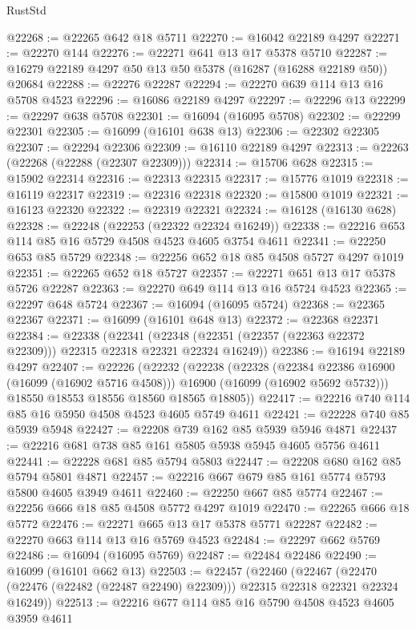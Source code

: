 \begin{lexlean}{RustStd}
\begin{coremodule}
@22268 := @22265 @642 @18 @5711
@22270 := @16042 @22189 @4297
@22271 := @22270 @144
@22276 := @22271 @641 @13 @17 @5378 @5710
@22287 := @16279 @22189 @4297 @50 @13 @50 @5378 (@16287 (@16288 @22189 @50)) @20684
@22288 := @22276 @22287
@22294 := @22270 @639 @114 @13 @16 @5708 @4523
@22296 := @16086 @22189 @4297
@22297 := @22296 @13
@22299 := @22297 @638 @5708
@22301 := @16094 (@16095 @5708)
@22302 := @22299 @22301
@22305 := @16099 (@16101 @638 @13)
@22306 := @22302 @22305
@22307 := @22294 @22306
@22309 := @16110 @22189 @4297
@22313 := @22263 (@22268 (@22288 (@22307 @22309)))
@22314 := @15706 @628
@22315 := @15902 @22314
@22316 := @22313 @22315
@22317 := @15776 @1019
@22318 := @16119 @22317
@22319 := @22316 @22318
@22320 := @15800 @1019
@22321 := @16123 @22320
@22322 := @22319 @22321
@22324 := @16128 (@16130 @628)
@22328 := @22248 (@22253 (@22322 @22324 @16249))
@22338 := @22216 @653 @114 @85 @16 @5729 @4508 @4523 @4605 @3754 @4611
@22341 := @22250 @653 @85 @5729
@22348 := @22256 @652 @18 @85 @4508 @5727 @4297 @1019
@22351 := @22265 @652 @18 @5727
@22357 := @22271 @651 @13 @17 @5378 @5726 @22287
@22363 := @22270 @649 @114 @13 @16 @5724 @4523
@22365 := @22297 @648 @5724
@22367 := @16094 (@16095 @5724)
@22368 := @22365 @22367
@22371 := @16099 (@16101 @648 @13)
@22372 := @22368 @22371
@22384 := @22338
    (@22341 (@22348 (@22351 (@22357 (@22363 @22372 @22309))) @22315 @22318 @22321 @22324 @16249))
@22386 := @16194 @22189 @4297
@22407 := @22226
    (@22232
      (@22238
        (@22328
          (@22384 @22386 @16900 (@16099 (@16902 @5716 @4508)))
          @16900
          (@16099 (@16902 @5692 @5732)))
        @18550
        @18553
        @18556
        @18560
        @18565
        @18805))
@22417 := @22216 @740 @114 @85 @16 @5950 @4508 @4523 @4605 @5749 @4611
@22421 := @22228 @740 @85 @5939 @5948
@22427 := @22208 @739 @162 @85 @5939 @5946 @4871
@22437 := @22216 @681 @738 @85 @161 @5805 @5938 @5945 @4605 @5756 @4611
@22441 := @22228 @681 @85 @5794 @5803
@22447 := @22208 @680 @162 @85 @5794 @5801 @4871
@22457 := @22216 @667 @679 @85 @161 @5774 @5793 @5800 @4605 @3949 @4611
@22460 := @22250 @667 @85 @5774
@22467 := @22256 @666 @18 @85 @4508 @5772 @4297 @1019
@22470 := @22265 @666 @18 @5772
@22476 := @22271 @665 @13 @17 @5378 @5771 @22287
@22482 := @22270 @663 @114 @13 @16 @5769 @4523
@22484 := @22297 @662 @5769
@22486 := @16094 (@16095 @5769)
@22487 := @22484 @22486
@22490 := @16099 (@16101 @662 @13)
@22503 := @22457
    (@22460
      (@22467 (@22470 (@22476 (@22482 (@22487 @22490) @22309))) @22315 @22318 @22321 @22324 @16249))
@22513 := @22216 @677 @114 @85 @16 @5790 @4508 @4523 @4605 @3959 @4611

\end{coremodule}
\end{lexlean}
